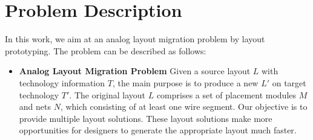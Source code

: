  \section{Problem Description}\label{sec:problem}

    In this work, we aim at an analog layout migration problem by layout prototyping. 
    The problem can be described as follows:

    \newcommand{\tabincell}[2]{\begin{tabular}{@{}#1@{}}#2\end{tabular}}
    \newsavebox{\tablebox}


    \begin{itemize}
    \item 
    {\bf Analog Layout Migration Problem} 
    Given a source layout $L$ with technology information $T$, the main purpose is to produce a new $L'$ on target technology $T'$. The original layout $L$ comprises a set of placement modules $M$ and nets $N$, which consisting of at least one wire segment. Our objective is to provide multiple layout solutions. These layout solutions make more opportunities for designers to generate the appropriate layout much faster.
    \end{itemize}

    